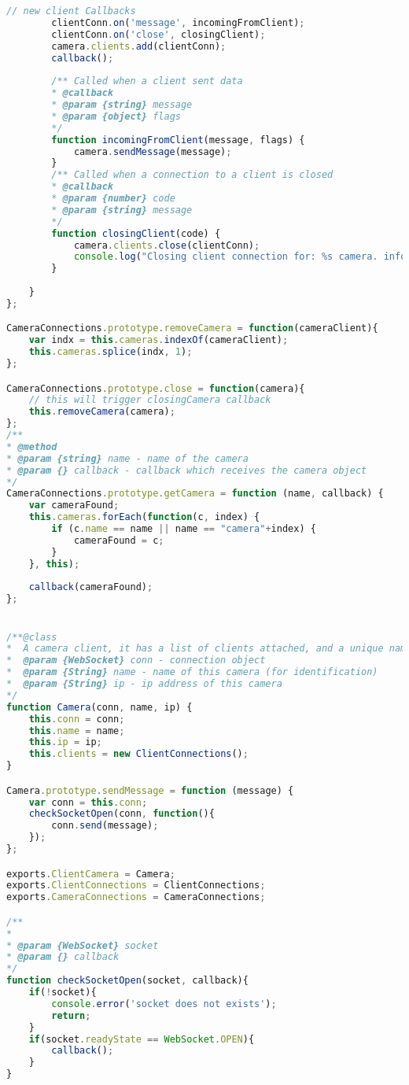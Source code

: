 \documentclass[hidelinks,11pt,a4paper,oneside,article]{memoir}
\begin{document}
\begin{lstlisting}[label={listing:nodejsimplementation},caption={implementation of server-side classes},language=JavaScript, style=styleprogrammingappendix]
        // new client Callbacks
        clientConn.on('message', incomingFromClient);
        clientConn.on('close', closingClient);
        camera.clients.add(clientConn);
        callback();
        
        /** Called when a client sent data
        * @callback
        * @param {string} message 
        * @param {object} flags 
        */
        function incomingFromClient(message, flags) {
            camera.sendMessage(message);
        }
        /** Called when a connection to a client is closed
        * @callback
        * @param {number} code 
        * @param {string} message 
        */
        function closingClient(code) {
            camera.clients.close(clientConn);
            console.log("Closing client connection for: %s camera. info: %d, %s", camera.name, code);
        }
        
    }
};

CameraConnections.prototype.removeCamera = function(cameraClient){
    var indx = this.cameras.indexOf(cameraClient);
    this.cameras.splice(indx, 1);
};

CameraConnections.prototype.close = function(camera){
    // this will trigger closingCamera callback
    this.removeCamera(camera);
};
/**
* @method
* @param {string} name - name of the camera
* @param {} callback - callback which receives the camera object
*/
CameraConnections.prototype.getCamera = function (name, callback) {
    var cameraFound;
    this.cameras.forEach(function(c, index) {
        if (c.name == name || name == "camera"+index) {
            cameraFound = c;
        }
    }, this);
    
    callback(cameraFound);
};


/**@class
*  A camera client, it has a list of clients attached, and a unique name
*  @param {WebSocket} conn - connection object
*  @param {String} name - name of this camera (for identification)
*  @param {String} ip - ip address of this camera
*/
function Camera(conn, name, ip) {
    this.conn = conn;
    this.name = name;
    this.ip = ip;
    this.clients = new ClientConnections();
}

Camera.prototype.sendMessage = function (message) {
    var conn = this.conn;
    checkSocketOpen(conn, function(){
        conn.send(message);
    });
};

exports.ClientCamera = Camera;
exports.ClientConnections = ClientConnections;
exports.CameraConnections = CameraConnections;

/**
* 
* @param {WebSocket} socket 
* @param {} callback
*/
function checkSocketOpen(socket, callback){
    if(!socket){
        console.error('socket does not exists');
        return;
    }
    if(socket.readyState == WebSocket.OPEN){
        callback();
    }
}
\end{lstlisting}
\end{document}
